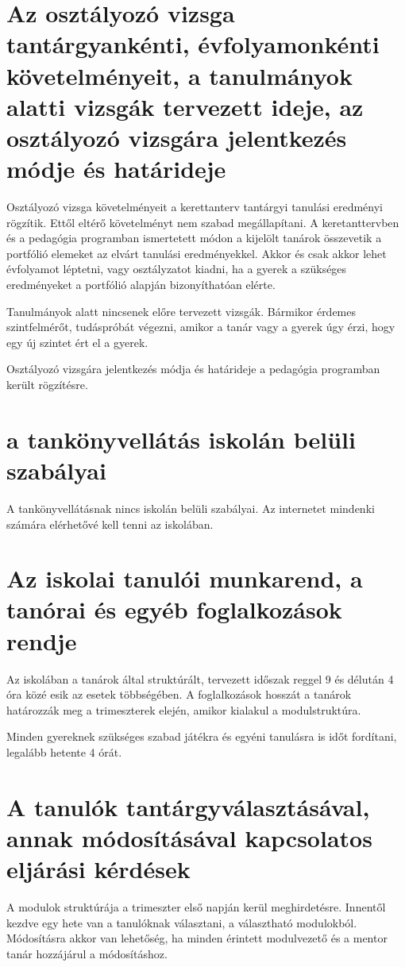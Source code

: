 \documentclass{article}
\begin{document}
\section{Az osztályozó vizsga tantárgyankénti, évfolyamonkénti követelményeit, a tanulmányok alatti vizsgák tervezett ideje, az osztályozó vizsgára jelentkezés módje és határideje}
Osztályozó vizsga követelményeit a kerettanterv tantárgyi tanulási eredményi rögzítik. Ettől eltérő követelményt nem szabad megállapítani. A keretanttervben és a pedagógia programban ismertetett módon a kijelölt tanárok összevetik a portfólió elemeket az elvárt tanulási eredményekkel. Akkor és csak akkor lehet évfolyamot léptetni, vagy osztályzatot kiadni, ha a gyerek a szükséges eredményeket a portfólió alapján bizonyíthatóan elérte.

Tanulmányok alatt nincsenek előre tervezett vizsgák. Bármikor érdemes szintfelmérőt, tudáspróbát végezni, amikor a tanár vagy a gyerek úgy érzi, hogy egy új szintet ért el a gyerek.

Osztályozó vizsgára jelentkezés módja és határideje a pedagógia programban került rögzítésre.
\section{a tankönyvellátás iskolán belüli szabályai}
A tankönyvellátásnak nincs iskolán belüli szabályai. Az internetet mindenki számára elérhetővé kell tenni az iskolában. 

\section{Az iskolai tanulói munkarend, a tanórai és egyéb foglalkozások rendje}
Az iskolában a tanárok által struktúrált, tervezett időszak reggel 9 és délután 4 óra közé esik az esetek többségében. A foglalkozások hosszát a tanárok határozzák meg a trimeszterek elején, amikor kialakul a modulstruktúra.

Minden gyereknek szükséges szabad játékra és egyéni tanulásra is időt fordítani, legalább hetente 4 órát.

\section{A tanulók tantárgyválasztásával, annak módosításával kapcsolatos eljárási kérdések}
A modulok struktúrája a trimeszter első napján kerül meghirdetésre. Innentől kezdve egy hete van a tanulóknak választani, a választható modulokból. Módosításra akkor van lehetőség, ha minden érintett modulvezető és a mentor tanár hozzájárul a módosításhoz.
\end{document}
